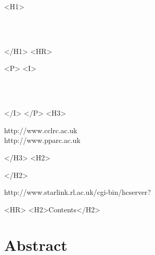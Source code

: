 \begin{htmlonly}
   \xlabel{}
   \begin{rawhtml} <H1> \end{rawhtml}
      \stardoctitle\\
      \stardocversion\\
      \stardocmanual
   \begin{rawhtml} </H1> <HR> \end{rawhtml}


   \begin{rawhtml} <P> <I> \end{rawhtml}
   \stardoccategory\ \stardocnumber \\
   \stardocauthors \\
   \stardocdate
   \begin{rawhtml} </I> </P> <H3> \end{rawhtml}
                        {http://www.cclrc.ac.uk} \\
                        {http://www.pparc.ac.uk} \\
   \begin{rawhtml} </H3> <H2> \end{rawhtml}
   \begin{rawhtml} </H2> \end{rawhtml}
      {http://www.starlink.rl.ac.uk/cgi-bin/hcserver?\stardocsource}\\

  \label{stardoccontents}
  \begin{rawhtml}
    <HR>
    <H2>Contents</H2>
  \end{rawhtml}

  \section{Abstract}
\end{htmlonly}

